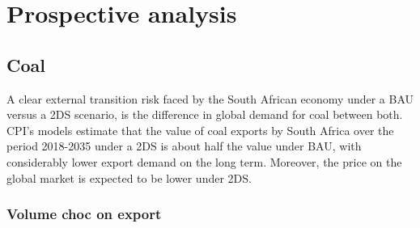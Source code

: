 \documentclass[12pt,english]{article}
\begin{document}
\citep{von2016energy}


\section{Prospective analysis}

\subsection{Coal}

A clear external transition risk faced by the South African economy under a BAU versus a 2DS scenario, is the difference in global demand for coal between both. CPI's models estimate that the value of coal exports by South Africa over the period 2018-2035 under a 2DS is about half the value under BAU, with considerably lower export demand on the long term. Moreover, the price on the global market is expected to be lower under 2DS. 

\subsubsection{Volume choc on export}
\end{document}
